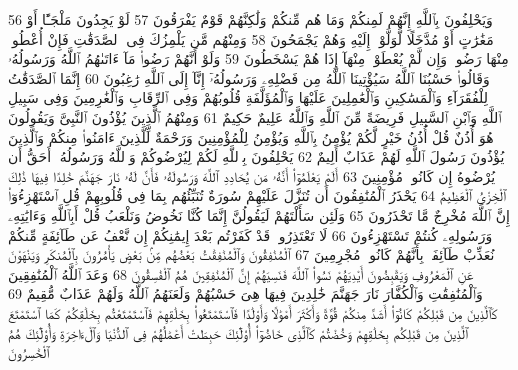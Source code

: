 {\tiny\colorbox{cl_aya}{56}} وَيَحْلِفُونَ بِٱللَّهِ إِنَّهُمْ لَمِنكُمْ وَمَا هُم مِّنكُمْ وَلَٰكِنَّهُمْ قَوْمٌ يَفْرَقُونَ
{\tiny\colorbox{cl_aya}{57}} لَوْ يَجِدُونَ مَلْجَـًٔا أَوْ مَغَٰرَٰتٍ أَوْ مُدَّخَلًا لَّوَلَّوْا۟ إِلَيْهِ وَهُمْ يَجْمَحُونَ
{\tiny\colorbox{cl_aya}{58}} وَمِنْهُم مَّن يَلْمِزُكَ فِى ٱلصَّدَقَٰتِ فَإِنْ أُعْطُوا۟ مِنْهَا رَضُوا۟ وَإِن لَّمْ يُعْطَوْا۟ مِنْهَآ إِذَا هُمْ يَسْخَطُونَ
{\tiny\colorbox{cl_aya}{59}} وَلَوْ أَنَّهُمْ رَضُوا۟ مَآ ءَاتَىٰهُمُ ٱللَّهُ وَرَسُولُهُۥ وَقَالُوا۟ حَسْبُنَا ٱللَّهُ سَيُؤْتِينَا ٱللَّهُ مِن فَضْلِهِۦ وَرَسُولُهُۥٓ إِنَّآ إِلَى ٱللَّهِ رَٰغِبُونَ
{\tiny\colorbox{cl_aya}{60}} إِنَّمَا ٱلصَّدَقَٰتُ لِلْفُقَرَآءِ وَٱلْمَسَٰكِينِ وَٱلْعَٰمِلِينَ عَلَيْهَا وَٱلْمُؤَلَّفَةِ قُلُوبُهُمْ وَفِى ٱلرِّقَابِ وَٱلْغَٰرِمِينَ وَفِى سَبِيلِ ٱللَّهِ وَٱبْنِ ٱلسَّبِيلِ فَرِيضَةً مِّنَ ٱللَّهِ وَٱللَّهُ عَلِيمٌ حَكِيمٌ
{\tiny\colorbox{cl_aya}{61}} وَمِنْهُمُ ٱلَّذِينَ يُؤْذُونَ ٱلنَّبِىَّ وَيَقُولُونَ هُوَ أُذُنٌ قُلْ أُذُنُ خَيْرٍ لَّكُمْ يُؤْمِنُ بِٱللَّهِ وَيُؤْمِنُ لِلْمُؤْمِنِينَ وَرَحْمَةٌ لِّلَّذِينَ ءَامَنُوا۟ مِنكُمْ وَٱلَّذِينَ يُؤْذُونَ رَسُولَ ٱللَّهِ لَهُمْ عَذَابٌ أَلِيمٌ
{\tiny\colorbox{cl_aya}{62}} يَحْلِفُونَ بِٱللَّهِ لَكُمْ لِيُرْضُوكُمْ وَٱللَّهُ وَرَسُولُهُۥٓ أَحَقُّ أَن يُرْضُوهُ إِن كَانُوا۟ مُؤْمِنِينَ
{\tiny\colorbox{cl_aya}{63}} أَلَمْ يَعْلَمُوٓا۟ أَنَّهُۥ مَن يُحَادِدِ ٱللَّهَ وَرَسُولَهُۥ فَأَنَّ لَهُۥ نَارَ جَهَنَّمَ خَٰلِدًا فِيهَا ذَٰلِكَ ٱلْخِزْىُ ٱلْعَظِيمُ
{\tiny\colorbox{cl_aya}{64}} يَحْذَرُ ٱلْمُنَٰفِقُونَ أَن تُنَزَّلَ عَلَيْهِمْ سُورَةٌ تُنَبِّئُهُم بِمَا فِى قُلُوبِهِمْ قُلِ ٱسْتَهْزِءُوٓا۟ إِنَّ ٱللَّهَ مُخْرِجٌ مَّا تَحْذَرُونَ
{\tiny\colorbox{cl_aya}{65}} وَلَئِن سَأَلْتَهُمْ لَيَقُولُنَّ إِنَّمَا كُنَّا نَخُوضُ وَنَلْعَبُ قُلْ أَبِٱللَّهِ وَءَايَٰتِهِۦ وَرَسُولِهِۦ كُنتُمْ تَسْتَهْزِءُونَ
{\tiny\colorbox{cl_aya}{66}} لَا تَعْتَذِرُوا۟ قَدْ كَفَرْتُم بَعْدَ إِيمَٰنِكُمْ إِن نَّعْفُ عَن طَآئِفَةٍ مِّنكُمْ نُعَذِّبْ طَآئِفَةًۢ بِأَنَّهُمْ كَانُوا۟ مُجْرِمِينَ
{\tiny\colorbox{cl_aya}{67}} ٱلْمُنَٰفِقُونَ وَٱلْمُنَٰفِقَٰتُ بَعْضُهُم مِّنۢ بَعْضٍ يَأْمُرُونَ بِٱلْمُنكَرِ وَيَنْهَوْنَ عَنِ ٱلْمَعْرُوفِ وَيَقْبِضُونَ أَيْدِيَهُمْ نَسُوا۟ ٱللَّهَ فَنَسِيَهُمْ إِنَّ ٱلْمُنَٰفِقِينَ هُمُ ٱلْفَٰسِقُونَ
{\tiny\colorbox{cl_aya}{68}} وَعَدَ ٱللَّهُ ٱلْمُنَٰفِقِينَ وَٱلْمُنَٰفِقَٰتِ وَٱلْكُفَّارَ نَارَ جَهَنَّمَ خَٰلِدِينَ فِيهَا هِىَ حَسْبُهُمْ وَلَعَنَهُمُ ٱللَّهُ وَلَهُمْ عَذَابٌ مُّقِيمٌ
{\tiny\colorbox{cl_aya}{69}} كَٱلَّذِينَ مِن قَبْلِكُمْ كَانُوٓا۟ أَشَدَّ مِنكُمْ قُوَّةً وَأَكْثَرَ أَمْوَٰلًا وَأَوْلَٰدًا فَٱسْتَمْتَعُوا۟ بِخَلَٰقِهِمْ فَٱسْتَمْتَعْتُم بِخَلَٰقِكُمْ كَمَا ٱسْتَمْتَعَ ٱلَّذِينَ مِن قَبْلِكُم بِخَلَٰقِهِمْ وَخُضْتُمْ كَٱلَّذِى خَاضُوٓا۟ أُو۟لَٰٓئِكَ حَبِطَتْ أَعْمَٰلُهُمْ فِى ٱلدُّنْيَا وَٱلْءَاخِرَةِ وَأُو۟لَٰٓئِكَ هُمُ ٱلْخَٰسِرُونَ
